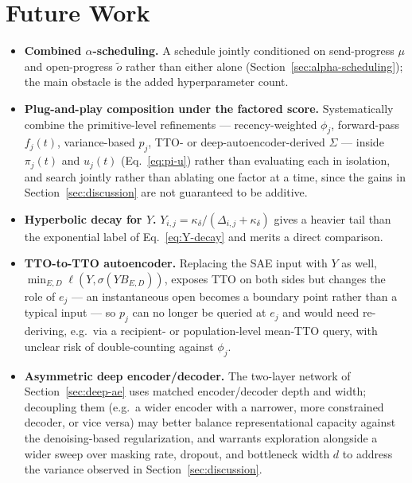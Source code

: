 \section{Future Work}
\label{sec:future-work}

\begin{itemize}[leftmargin=*]

\item \textbf{Combined $\alpha$-scheduling.} A schedule jointly
  conditioned on send-progress $\mu$ and open-progress $\tilde o$ rather
  than either alone (Section~\ref{sec:alpha-scheduling}); the main
  obstacle is the added hyperparameter count.

\item \textbf{Plug-and-play composition under the factored score.}
  Systematically combine the primitive-level refinements ---
  recency-weighted $\phi_j$, forward-pass $f_j(t)$, variance-based $p_j$,
  TTO- or deep-autoencoder-derived $\Sigma$ --- inside $\pi_j(t)$ and
  $u_j(t)$ (Eq.~\eqref{eq:pi-u}) rather than evaluating each in isolation,
  and search jointly rather than ablating one factor at a time, since the
  gains in Section~\ref{sec:discussion} are not guaranteed to be additive.

\item \textbf{Hyperbolic decay for $Y$.}
  $Y_{i,j} = \kappa_\delta/(\Delta_{i,j}+\kappa_\delta)$ gives a heavier
  tail than the exponential label of Eq.~\eqref{eq:Y-decay} and merits a
  direct comparison.

\item \textbf{TTO-to-TTO autoencoder.} Replacing the SAE input with $Y$ as
  well, $\min_{E,D}\ell(Y,\sigma(YB_{E,D}))$, exposes TTO on both sides but
  changes the role of $e_j$ --- an instantaneous open becomes a boundary
  point rather than a typical input --- so $p_j$ can no longer be queried
  at $e_j$ and would need re-deriving, e.g.\ via a recipient- or
  population-level mean-TTO query, with unclear risk of double-counting
  against $\phi_j$.

\item \textbf{Asymmetric deep encoder/decoder.} The two-layer network of
  Section~\ref{sec:deep-ae} uses matched encoder/decoder depth and width;
  decoupling them (e.g.\ a wider encoder with a narrower, more
  constrained decoder, or vice versa) may better balance representational
  capacity against the denoising-based regularization, and warrants
  exploration alongside a wider sweep over masking rate, dropout, and
  bottleneck width $d$ to address the variance observed in
  Section~\ref{sec:discussion}.

\end{itemize}
